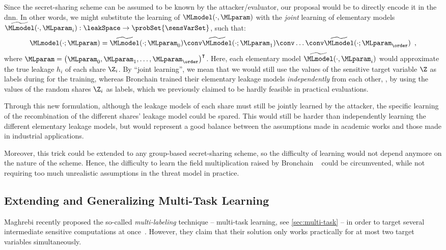 		Since the secret-sharing scheme can be assumed to be known by the attacker/evaluator, our proposal would be to directly encode it in the \gls{dnn}.
		In other words, we might substitute the learning of \(\MLmodel(\cdot, \MLparam)\) with the \emph{joint} learning of elementary models \(\widetilde{\MLmodel}(\cdot, \MLparam_i): \leakSpace \rightarrow \probSet{\sensVarSet}\), such that:
		\begin{equation}
			\MLmodel(\cdot; \MLparam) = \widetilde{\MLmodel}(\cdot; \MLparam_0) \conv \widetilde{\MLmodel}(\cdot; \MLparam_1) \conv \ldots \conv \widetilde{\MLmodel}(\cdot; \MLparam_\order) \enspace ,
		\end{equation}
		where \(\MLparam = \left(\MLparam_0, \MLparam_1, \ldots, \MLparam_\order \right)^\intercal\).
		Here, each elementary model \(\widetilde{\MLmodel}(\cdot, \MLparam_i)\) would approximate the true leakage \(h_i\) of each share \(\Z_i\).
		By ``joint learning'', we mean that we would still use the values of the sensitive target variable \(\Z\) as labels during for the training, whereas Bronchain \etal{} trained their elementary leakage models \emph{independently} from each other, \ie{}, by using the values of the random shares \(\Z_i\) as labels, which we previously claimed to be hardly feasible in practical evaluations.

		Through this new formulation, although the leakage models of each share must still be jointly learned by the attacker, the specific learning of the recombination of the different shares' leakage model could be spared.
		This would still be harder than independently learning the different elementary leakage models, but would represent a good balance between the assumptions made in academic works and those made in industrial applications.

		Moreover, this trick could be extended to any group-based secret-sharing scheme, so the difficulty of learning would not depend anymore on the nature of the scheme.
		Hence, the difficulty to learn the field multiplication raised by Bronchain \etal{}~\cite{bronchain_dissection_2020} could be circumvented, while not requiring too much unrealistic assumptions in the threat model in practice.

	\subsection{Extending and Generalizing Multi-Task Learning}
		Maghrebi recently proposed the so-called \emph{multi-labeling} technique -- \aka{} multi-task learning, see \autoref{sec:multi-task} -- in order to target several intermediate sensitive computations at once~\cite{maghrebi_deep_2020}.
		However, they claim that their solution only works practically for at most two target variables simultaneously.


